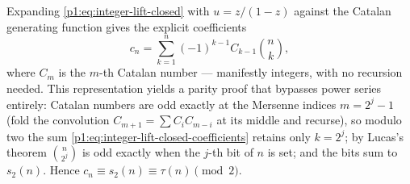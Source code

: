 \documentclass[11pt,oneside]{article}
\numberwithin{equation}{section}
\theoremstyle{definition}
\theoremstyle{remark}
\begin{document}
\begin{remark}
\label{p1:rem:integer-lift-closed-form}
Expanding \eqref{p1:eq:integer-lift-closed} with
\(u=z/(1-z)\) against the Catalan generating function gives the
explicit coefficients
\begin{equation}
  c_n=\sum_{k=1}^{n}(-1)^{k-1}C_{k-1}\binom nk,
  \label{p1:eq:integer-lift-closed-coefficients}
\end{equation}
where \(C_m\) is the \(m\)-th Catalan number --- manifestly
integers, with no recursion needed.  This representation yields a
parity proof that bypasses power series entirely: Catalan numbers are
odd exactly at the Mersenne indices \(m=2^j-1\) (fold the
convolution \(C_{m+1}=\sum C_iC_{m-i}\) at its middle and recurse),
so modulo two the sum \eqref{p1:eq:integer-lift-closed-coefficients}
retains only \(k=2^j\); by Lucas's theorem
\(\binom n{2^j}\) is odd exactly when the \(j\)-th bit of \(n\)
is set; and the bits sum to \(s_2(n)\).  Hence
\(c_n\equiv s_2(n)\equiv\tau(n)\pmod2\).
\end{remark}
\end{document}
